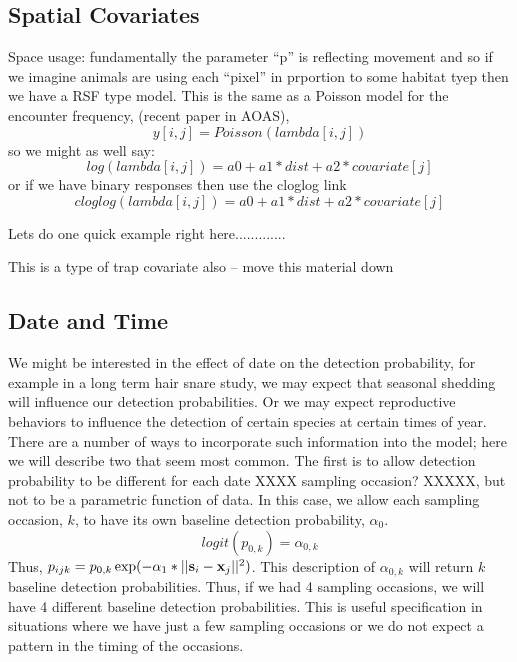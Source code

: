 \subsection{Spatial Covariates}

Space usage: fundamentally the parameter ``p'' is reflecting movement
and so if we imagine animals are using each ``pixel'' in prportion to
some habitat tyep then we have a RSF type model. This is the same
as a Poisson model for the encounter frequency, (recent paper in AOAS),
\[
 y[i,j] = Poisson(lambda[i,j])
\]
so we might as well say:
\[
log(lambda[i,j]) = a0 + a1*dist + a2*covariate[j]
\]
or if we have binary responses then use the cloglog link
\[
 cloglog(lambda[i,j]) = a0 + a1*dist + a2*covariate[j]
\]

Lets do one quick example right here.............

This is a type of trap covariate also -- move this material down 



\subsection{Date and Time}

We might be interested in the effect of date on the detection
probability, for example in a long term hair snare study, we may
expect that seasonal shedding will influence our detection
probabilities.  Or we may expect reproductive behaviors to influence
the detection of certain species at certain times of year.  There are
a number of ways to incorporate such information into the model; here
we will describe two that seem most common.  The first is to allow
detection probability to be different for each date XXXX sampling
occasion? XXXXX, but not to be a
parametric function of data.  In this case, we allow each sampling
occasion, $k$, to have its own baseline detection probability,
$\alpha_0$.
\[
logit(p_{0,k}) = \alpha_{0,k}
\]
Thus, $p_{ijk} = p_{0,k} \exp(- \alpha_1*||{\bf s}_{i}-{\bf x}_{j}||^2)$. This
description of $\alpha_{0,k}$ will return $k$ baseline detection
probabilities.  Thus, if we had 4 sampling occasions, we will have 4
different baseline detection probabilities.  This is useful
specification in situations where we have just a few sampling
occasions or we do not expect a pattern in the timing of the
occasions.


